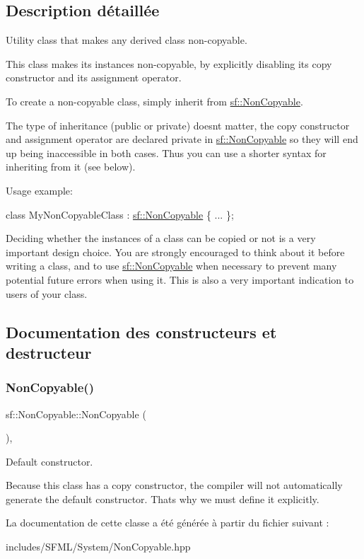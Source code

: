 \subsection{Description détaillée}
Utility class that makes any derived class non-\/copyable. 

This class makes its instances non-\/copyable, by explicitly disabling its copy constructor and its assignment operator.

To create a non-\/copyable class, simply inherit from \hyperlink{classsf_1_1NonCopyable}{sf\+::\+Non\+Copyable}.

The type of inheritance (public or private) doesn\textquotesingle{}t matter, the copy constructor and assignment operator are declared private in \hyperlink{classsf_1_1NonCopyable}{sf\+::\+Non\+Copyable} so they will end up being inaccessible in both cases. Thus you can use a shorter syntax for inheriting from it (see below).

Usage example\+: 
\begin{DoxyCode}
\textcolor{keyword}{class }MyNonCopyableClass : \hyperlink{classsf_1_1NonCopyable}{sf::NonCopyable}
\{
    ...
\};
\end{DoxyCode}


Deciding whether the instances of a class can be copied or not is a very important design choice. You are strongly encouraged to think about it before writing a class, and to use \hyperlink{classsf_1_1NonCopyable}{sf\+::\+Non\+Copyable} when necessary to prevent many potential future errors when using it. This is also a very important indication to users of your class. 

\subsection{Documentation des constructeurs et destructeur}
\mbox{\label{classsf_1_1NonCopyable_a2110add170580fdb946f887719da6860}} 
\subsubsection{\texorpdfstring{Non\+Copyable()}{NonCopyable()}}
{\footnotesize\ttfamily sf\+::\+Non\+Copyable\+::\+Non\+Copyable (\begin{DoxyParamCaption}{ }\end{DoxyParamCaption})\hspace{0.3cm}{\ttfamily [inline]}, {\ttfamily [protected]}}



Default constructor. 

Because this class has a copy constructor, the compiler will not automatically generate the default constructor. That\textquotesingle{}s why we must define it explicitly. 

La documentation de cette classe a été générée à partir du fichier suivant \+:\begin{DoxyCompactItemize}
\item 
includes/\+S\+F\+M\+L/\+System/Non\+Copyable.\+hpp\end{DoxyCompactItemize}
